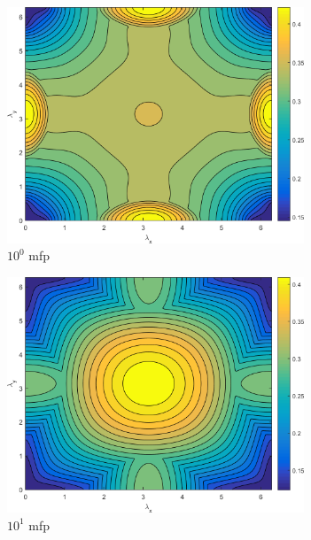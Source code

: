 \begin{figure}
	{
	\begin{subfigure}[b]{0.485\textwidth}
		\centering
		\includegraphics[width=0.975\textwidth]{figures/appendices/SI_M4S_UPWLD1_LS8_x=1_dydx=1_contour.png}
		\caption{$10^{0}$ mfp}
	\end{subfigure}
	\hfill
	\begin{subfigure}[b]{0.485\textwidth}
		\centering
		\includegraphics[width=0.975\textwidth]{figures/appendices/SI_M4S_UPWLD1_LS8_x=10_dydx=1_contour.png}
		\caption{$10^{1}$ mfp}
	\end{subfigure}
	}
	\vspace{0.5cm}
	{
	\begin{subfigure}[b]{0.485\textwidth}

\end{subfigure}}
\end{figure}
